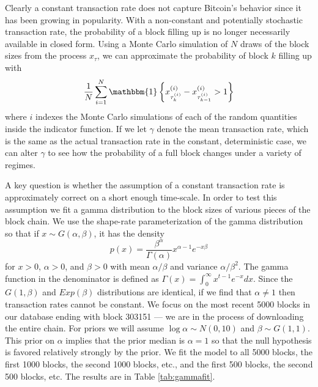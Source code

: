 \documentclass{article}
\begin{document}
Clearly a constant transaction rate does not capture Bitcoin's behavior since it has been growing in popularity. With a non-constant and potentially stochastic transaction rate, the probability of a block filling up is no longer necessarily available in closed form. Using a Monte Carlo simulation of $N$ draws of the block sizes from the process $x_{\tau}$, we can approximate the probability of block $k$ filling up with
\[
\frac{1}{N}\sum_{i=1}^N\mathbbm{1}\left\{x^{(i)}_{\tau_{k}^{(i)}} - x^{(i)}_{\tau_{k-1}^{(i)}} > 1\right\}
\]
where $i$ indexes the Monte Carlo simulations of each of the random quantities inside the indicator function. If we let $\gamma$ denote the mean transaction rate, which is the same as the actual transaction rate in the constant, deterministic case, we can alter $\gamma$ to see how the probability of a full block changes under a variety of regimes.

A key question is whether the assumption of a constant transaction rate is approximately correct on a short enough time-scale. In order to test this assumption we fit a gamma distribution to the block sizes of various pieces of the block chain. We use the shape-rate parameterization of the gamma distribution so that if $x\sim G(\alpha,\beta)$, it has the density
\[
p(x) = \frac{\beta^\alpha}{\Gamma(\alpha)}x^{\alpha-1}e^{-x\beta}
\]
for $x>0$, $\alpha>0$, and $\beta>0$ with mean $\alpha/\beta$ and variance $\alpha/\beta^2$. The gamma function in the denominator is defined as $\Gamma(x) = \int_0^\infty x^{t-1}e^{-x}dx$. Since the $G(1,\beta)$ and $Exp(\beta)$ distributions are identical, if we find that $\alpha\neq 1$ then transaction rates cannot be constant. We focus on the most recent 5000 blocks in our database ending with block 303151 --- we are in the process of downloading the entire chain.  For priors we will assume $\log \alpha \sim N(0, 10)$ and $\beta \sim G(1, 1)$. This prior on $\alpha$ implies that the prior median is $\alpha=1$ so that the null hypothesis is favored relatively strongly by the prior. We fit the model to all 5000 blocks, the first 1000 blocks, the second 1000 blocks, etc., and the first 500 blocks, the second 500 blocks, etc. The results are in Table \ref{tab:gammafit}. 
\end{document}
